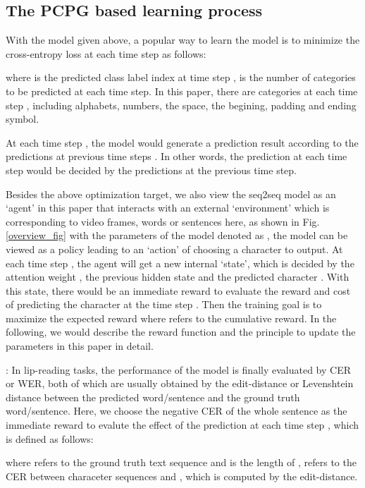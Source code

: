 \documentclass[a4paper, 10pt, conference]{ieeeconf}      \usepackage{FG2020}
\begin{document}
\subsection{The PCPG based learning process }
With the model given above, a popular way to learn the model is to minimize the cross-entropy loss   at each time step as follows:

\vspace{-0.5cm}

where  is the predicted class label index at time step ,  is the number of categories to be predicted at each time step. In this paper, there are  categories at each time step , including  alphabets,  numbers, the space, the begining, padding and ending symbol. 

At each time step , the model would generate a prediction result according to the predictions at previous time steps . In other words, the prediction at each time step would be decided by the predictions at the previous time step.  

Besides the above optimization target, we also view the seq2seq model as an `agent' in this paper that interacts with an external `environment' which is corresponding to video frames, words or sentences here, as shown in Fig. \ref{overview_fig} with the parameters of the model denoted as , the model can be viewed as a policy  leading to an `action' of choosing a character to output. At each time step , the agent will get a new internal `state', which is decided by the attention weight , the previous hidden state  and the predicted character . With this state, there would be an immediate reward  to evaluate the reward and cost of predicting the character  at the time step . Then the training goal is to maximize the expected reward  where  refers to the cumulative reward. In the following, we would describe the reward function and the principle to update the parameters in this paper in detail.

: In lip-reading tasks, the performance of the model is finally evaluated by CER or WER, both of which are usually obtained by the edit-distance or Levenshtein distance between the predicted word/sentence and the ground truth word/sentence. Here, we choose the negative CER of the whole sentence as the immediate reward  to evalute the effect of the prediction at each time step , which is defined as follows:

where  refers to the ground truth text sequence and  is the length of ,  refers to the CER between characeter sequences  and , which is computed by the edit-distance.
\end{document}
